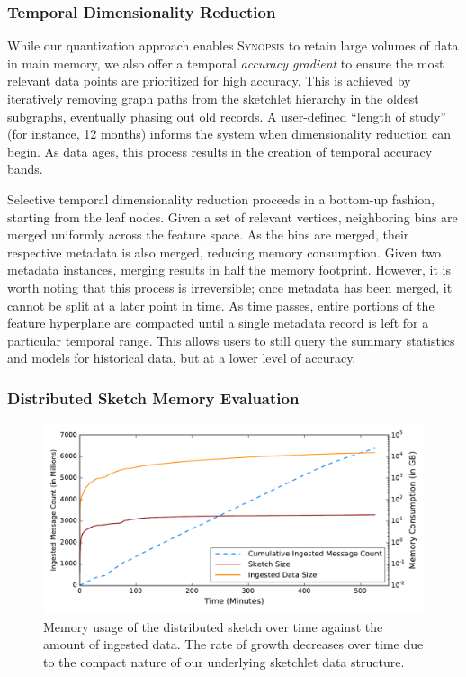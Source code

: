 \subsubsection{Temporal Dimensionality Reduction}
While our quantization approach enables \textsc{Synopsis} to retain large volumes of data in main memory, we also offer a temporal \emph{accuracy gradient} to ensure the most relevant data points are prioritized for high accuracy. This is achieved by iteratively removing graph paths from the sketchlet hierarchy in the oldest subgraphs, eventually phasing out old records. A user-defined ``length of study'' (for instance, 12 months) informs the system when dimensionality reduction can begin. As data ages, this process results in the creation of temporal accuracy bands.

Selective temporal dimensionality reduction proceeds in a bottom-up fashion, starting from the leaf nodes. Given a set of relevant vertices, neighboring bins are merged uniformly across the feature space. As the bins are merged, their respective metadata is also merged, reducing memory consumption. Given two metadata instances, merging results in half the memory footprint. However, it is worth noting that this process is irreversible; once metadata has been merged, it cannot be split at a later point in time. As time passes, entire portions of the feature hyperplane are compacted until a single metadata record is left for a particular temporal range. This allows users to still query the summary statistics and models for historical data, but at a lower level of accuracy.

\subsubsection{Distributed Sketch Memory Evaluation}

\begin{figure}[b]
    \centerline{\includegraphics[width=\linewidth]{figures/ing-and-mem-usage.pdf}}
    \caption{Memory usage of the distributed sketch over time against the amount of ingested data. The rate of growth decreases over time due to the compact nature of our underlying sketchlet data structure.}
    \label{fig:dist-sketch-mem-usage}
\end{figure}


